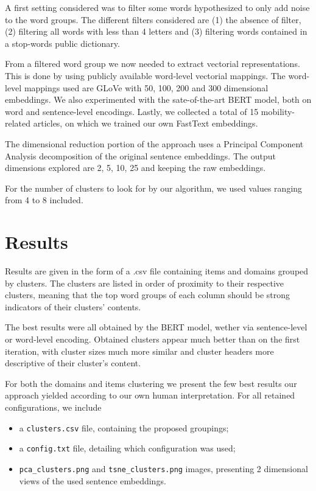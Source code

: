 \documentclass{article}
\begin{document}
A first setting considered was to filter some words hypothesized
to only add noise to the word groups. The different filters considered are (1) the absence
of filter, (2) filtering all words with less than 4 letters and (3) filtering words contained
in a stop-words public dictionary.

From a filtered word group we now needed to extract vectorial representations. This is done
by using publicly available word-level vectorial mappings. The word-level mappings used
are GLoVe with 50, 100, 200 and 300 dimensional embeddings. We also experimented with
the sate-of-the-art BERT model, both on word and sentence-level encodings. Lastly, we
collected a total of 15 mobility-related articles, on which we trained our own FastText
embeddings.

The dimensional reduction portion of the approach uses a Principal Component Analysis
decomposition of the original sentence embeddings. The output dimensions explored are {2, 5, 10, 25}
and keeping the raw embeddings.

For the number of clusters to look for by our algorithm, we used values ranging from 4 to 8
included.


\section*{Results}

Results are given in the form of a .csv file containing items and domains grouped by clusters.
The clusters are listed in order of proximity to their respective clusters, meaning that
the top word groups of each column should be strong indicators of their clusters' contents.

The best results were all obtained by the BERT model, wether via sentence-level or word-level
encoding. Obtained clusters appear much better than on the first iteration, with cluster sizes
much more similar and cluster headers more descriptive of their cluster's content.

For both the domains and items clustering we present the few best results our approach
yielded according to our own human interpretation. For all retained configurations, we include
\begin{itemize}
    \item a \texttt{clusters.csv} file, containing the proposed groupings;
    \item a \texttt{config.txt} file, detailing which configuration was used;
    \item \texttt{pca\_clusters.png} and \texttt{tsne\_clusters.png} images, presenting 2 dimensional
          views of the used sentence embeddings.
\end{itemize}
\end{document}
